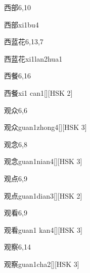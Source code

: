 \begin{entry}{西部}{6,10}
  \begin{phonetics}{西部}{xi1bu4}
  \end{phonetics}
\end{entry}

\begin{entry}{西蓝花}{6,13,7}
  \begin{phonetics}{西蓝花}{xi1lan2hua1}
  \end{phonetics}
\end{entry}

\begin{entry}{西餐}{6,16}
  \begin{phonetics}{西餐}{xi1 can1}[][HSK 2]
  \end{phonetics}
\end{entry}

\begin{entry}{观众}{6,6}
  \begin{phonetics}{观众}{guan1zhong4}[][HSK 3]
  \end{phonetics}
\end{entry}

\begin{entry}{观念}{6,8}
  \begin{phonetics}{观念}{guan1nian4}[][HSK 3]
  \end{phonetics}
\end{entry}

\begin{entry}{观点}{6,9}
  \begin{phonetics}{观点}{guan1dian3}[][HSK 2]
  \end{phonetics}
\end{entry}

\begin{entry}{观看}{6,9}
  \begin{phonetics}{观看}{guan1 kan4}[][HSK 3]
  \end{phonetics}
\end{entry}

\begin{entry}{观察}{6,14}
  \begin{phonetics}{观察}{guan1cha2}[][HSK 3]
  \end{phonetics}
\end{entry}


